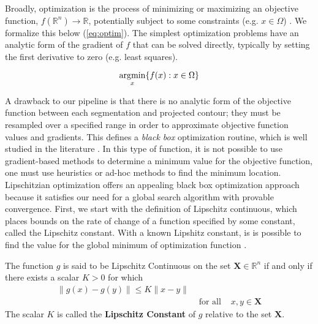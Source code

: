 Broadly, optimization is the process of minimizing or maximizing an objective function, $f(\mathbb{R}^{n}) \rightarrow \mathbb{R}$, potentially subject to some constraints (e.g. $x \in \Omega$) \cite{audetDerivativeFreeBlackboxOptimization2017}. We formalize this below (\cref{eq:optim}). The simplest optimization problems have an analytic form of the gradient of $f$ that can be solved directly, typically by setting the first derivative to zero (e.g. least squares).

\begin{equation}
    \operatorname*{\arg\!min}_{x}\{f(x) : x \in \Omega\}
    \label{eq:optim}
\end{equation}

A drawback to our pipeline is that there is no analytic form of the objective function between each segmentation and projected contour; they must be resampled over a specified range in order to approximate objective function values and gradients. This defines a \emph{black box} optimization routine, which is well studied in the literature \cite{audetDerivativeFreeBlackboxOptimization2017}. In this type of function, it is not possible to use gradient-based methods to determine a minimum value for the objective function, one must use heuristics or ad-hoc methods to find the minimum location. Lipschitzian optimization offers an appealing black box optimization approach because it satisfies our need for a global search algorithm with provable convergence. First, we start with the definition of Lipschitz continuous, which places bounds on the rate of change of a function specified by some constant, called the Lipschitz constant. With a known Lipshitz constant, is is possible to find the value for the global minimum of optimization function \cite{dreisigmeyerDIRECTSEARCHMETHODS2007}.

\begin{mdframed}
    \begin{definition}
        The function $g$ is said to be Lipschitz Continuous on the set $\mathbf{X} \in \mathbb{R}^n$ if and only if there exists a scalar $K > 0$ for which
        \begin{equation*}
            \begin{aligned}
                \|g(x) - g(y)\| \le K\|x - y\|  & \\
                &\text{  for all  }& x,y \in \mathbf{X}
            \end{aligned}
        \end{equation*}
        The scalar $K$ is called the {\bf Lipschitz Constant} of $g$ relative to the set $\mathbf{X}$.
    \end{definition}
\end{mdframed}

